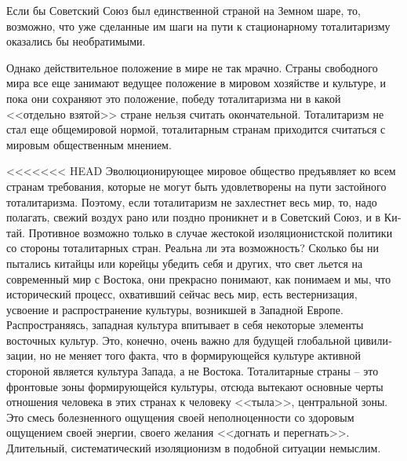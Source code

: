 \documentclass{book}
\begin{document}
{Если бы Советский Союз был единственной страной на Земном шаре, то, возможно, что уже сделанные им шаги на пути к стационарному тоталитаризму оказались бы необратимыми.

Однако действительное положение в мире не так мрачно. Страны свободного мира все еще занимают ведущее положение в мировом хозяйстве и культуре, и пока они сохраняют это поло­жение, победу тоталитаризма ни в какой <<отдельно взятой>> стране нельзя считать окончательной. Тоталитаризм не стал еще общемировой нормой, тоталитарным странам приходится считаться с мировым общественным мнением.

<<<<<<< HEAD
Эволюционирующее мировое общество предъявляет ко всем странам требования, которые не могут быть удовлетво­рены на пути застойного тоталитаризма. Поэтому, если тотали­таризм не захлестнет весь мир, то, надо полагать, свежий воз­дух рано или поздно проникнет и в Советский Союз, и в Ки­тай. Противное возможно только в случае жестокой изоляци­онистской политики со стороны тоталитарных стран. Реальна ли эта возможность? Сколько бы ни пытались китайцы или ко­рейцы убедить себя и других, что свет льется на современный мир с Востока, они прекрасно понимают, как понимаем и мы, что исторический процесс, охвативший сейчас весь мир, есть вестернизация,  усвоение и распространение культуры, возник­шей в Западной Европе. Распространяясь, западная культура впитывает в себя некоторые элементы восточных культур. Это, конечно, очень важно для будущей глобальной цивили­зации, но не меняет того факта, что в формирующейся культу­ре активной стороной является культура Запада, а не Востока. Тоталитарные страны -- это фронтовые зоны формирующейся культуры, отсюда вытекают основные черты отношения чело­века в этих странах к человеку <<тыла>>, центральной зоны. Это смесь болезненного ощущения своей неполноценности со здо­ровым ощущением своей энергии, своего желания <<догнать и перегнать>>. Длительный, систематический изоляционизм в по­добной ситуации немыслим.

}
\end{document}
